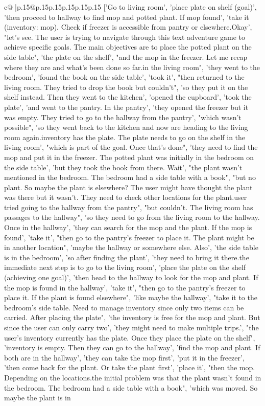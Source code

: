 \documentclass{article}
\begin{document}
{\begin{supertabular}{c@{$\;$}|p{.15\linewidth}@{}p{.15\linewidth}p{.15\linewidth}p{.15\linewidth}p{.15\linewidth}p{.15\linewidth}}
{{{	 ['Go to living room', 'place plate on shelf (goal)', 'then proceed to hallway to find mop and potted plant. If mop found', 'take it (inventory: mop). Check if freezer is accessible from pantry or elsewhere.Okay', "let's see. The user is trying to navigate through this text adventure game to achieve specific goals. The main objectives are to place the potted plant on the side table", 'the plate on the shelf', "and the mop in the freezer. Let me recap where they are and what's been done so far.\n\nStarting in the living room", 'they went to the bedroom', 'found the book on the side table', 'took it', "then returned to the living room. They tried to drop the book but couldn't", 'so they put it on the shelf instead. Then they went to the kitchen', 'opened the cupboard', 'took the plate', 'and went to the pantry. In the pantry', 'they opened the freezer but it was empty. They tried to go to the hallway from the pantry', "which wasn't possible", 'so they went back to the kitchen and now are heading to the living room again.\n\nCurrent inventory has the plate. The plate needs to go on the shelf in the living room', "which is part of the goal. Once that's done", 'they need to find the mop and put it in the freezer. The potted plant was initially in the bedroom on the side table', 'but they took the book from there. Wait', "the plant wasn't mentioned in the bedroom. The bedroom had a side table with a book", "but no plant. So maybe the plant is elsewhere? The user might have thought the plant was there but it wasn't. They need to check other locations for the plant.\n\nThe user tried going to the hallway from the pantry", "but couldn't. The living room has passages to the hallway", 'so they need to go from the living room to the hallway. Once in the hallway', 'they can search for the mop and the plant. If the mop is found', 'take it', "then go to the pantry's freezer to place it. The plant might be in another location", 'maybe the hallway or somewhere else. Also', 'the side table is in the bedroom', 'so after finding the plant', 'they need to bring it there.\n\nSo the immediate next step is to go to the living room', 'place the plate on the shelf (achieving one goal)', 'then head to the hallway to look for the mop and plant. If the mop is found in the hallway', 'take it', "then go to the pantry's freezer to place it. If the plant is found elsewhere", 'like maybe the hallway', "take it to the bedroom's side table. Need to manage inventory since only two items can be carried. After placing the plate", 'the inventory is free for the mop and plant. But since the user can only carry two', 'they might need to make multiple trips.\n\nWait', "the user's inventory currently has the plate. Once they place the plate on the shelf", 'inventory is empty. Then they can go to the hallway', 'find the mop and plant. If both are in the hallway', 'they can take the mop first', 'put it in the freezer', 'then come back for the plant. Or take the plant first', 'place it', "then the mop. Depending on the locations.\n\nBut the initial problem was that the plant wasn't found in the bedroom. The bedroom had a side table with a book", 'which was moved. So maybe the plant is in }}}
\end{supertabular}}
\end{document}
